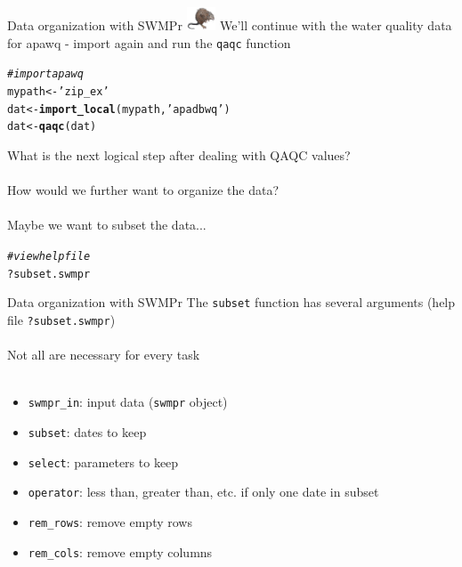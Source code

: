 \documentclass[xcolor=dvipsnames]{beamer}\usepackage[]{graphicx}\usepackage[]{color}
\makeatletter
\newcommand{\hlstr}[1]{\textcolor[rgb]{0.192,0.494,0.8}{#1}}%
\newcommand{\hlcom}[1]{\textcolor[rgb]{0.678,0.584,0.686}{\textit{#1}}}%
\newcommand{\hlopt}[1]{\textcolor[rgb]{0,0,0}{#1}}%
\newcommand{\hlstd}[1]{\textcolor[rgb]{0.345,0.345,0.345}{#1}}%
\newcommand{\hlkwb}[1]{\textcolor[rgb]{0.69,0.353,0.396}{#1}}%
\newcommand{\hlkwd}[1]{\textcolor[rgb]{0.737,0.353,0.396}{\textbf{#1}}}%
\newenvironment{kframe}{%
 \def\at@end@of@kframe{}%
 \ifinner\ifhmode%
  \def\at@end@of@kframe{\end{minipage}}%
  \begin{minipage}{\columnwidth}%
 \fi\fi%
 \def\FrameCommand##1{\hskip\@totalleftmargin \hskip-\fboxsep
 \colorbox{shadecolor}{##1}\hskip-\fboxsep
     \hskip-\linewidth \hskip-\@totalleftmargin \hskip\columnwidth}%
 \MakeFramed {\advance\hsize-\width
   \@totalleftmargin\z@ \linewidth\hsize
   \@setminipage}}%
 {\par\unskip\endMakeFramed%
 \at@end@of@kframe}
\newenvironment{knitrout}{}{} %
\makeatother
\begin{document}
\begin{frame}[fragile]{Data organization with SWMPr \includegraphics[width = 0.065\textwidth]{imgs/swmprat.png}} 
\onslide<+->
We'll continue with the water quality data for apawq - import again and run the \texttt{qaqc} function
\onslide<+->
\begin{knitrout}\scriptsize
{}\color{fgcolor}\begin{kframe}
\begin{alltt}
\hlcom{# import apawq}
\hlstd{mypath} \hlkwb{<-} \hlstr{'zip_ex'}
\hlstd{dat} \hlkwb{<-} \hlkwd{import_local}\hlstd{(mypath,} \hlstr{'apadbwq'}\hlstd{)}
\hlstd{dat} \hlkwb{<-} \hlkwd{qaqc}\hlstd{(dat)}
\end{alltt}
\end{kframe}
\end{knitrout}
\onslide<+->
What is the next logical step after dealing with QAQC values? \\~\\
How would we further want to organize the data? \\~\\
Maybe we want to subset the data... 
\begin{knitrout}\scriptsize
{}\color{fgcolor}\begin{kframe}
\begin{alltt}
\hlcom{# view help file}
\hlopt{?}\hlstd{subset.swmpr}
\end{alltt}
\end{kframe}
\end{knitrout}
\end{frame}

\begin{frame}[fragile]{Data organization with SWMPr}
The \texttt{subset} function has several arguments (help file \texttt{?subset.swmpr})\\~\\
Not all are necessary for every task \\~\\
\begin{itemize}
\item \texttt{swmpr\_in}: input data (\texttt{swmpr} object)
\item \texttt{subset}: dates to keep
\item \texttt{select}: parameters to keep
\item \texttt{operator}: less than, greater than, etc. if only one date in subset
\item \texttt{rem\_rows}: remove empty rows
\item \texttt{rem\_cols}: remove empty columns \\~\\
\end{itemize}
\end{frame}
\end{document}
